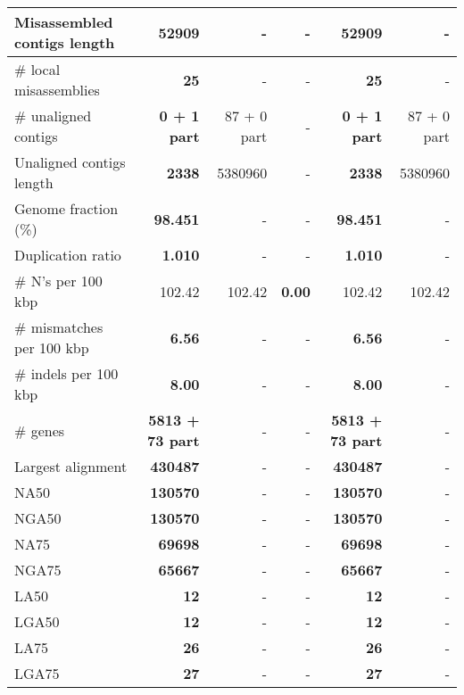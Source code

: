 \documentclass[12pt,a4paper]{article}
\begin{document}
\begin{table}[ht]
\begin{center}
\begin{tabular}{|l*{5}{|r}|}
Misassembled contigs length & {\bf 52909} & - & - & {\bf 52909} & - \\ \hline
\# local misassemblies & {\bf 25} & - & - & {\bf 25} & - \\ \hline
\# unaligned contigs & {\bf 0 + 1 part} & 87 + 0 part & - & {\bf 0 + 1 part} & 87 + 0 part \\ \hline
Unaligned contigs length & {\bf 2338} & 5380960 & - & {\bf 2338} & 5380960 \\ \hline
Genome fraction (\%) & {\bf 98.451} & - & - & {\bf 98.451} & - \\ \hline
Duplication ratio & {\bf 1.010} & - & - & {\bf 1.010} & - \\ \hline
\# N's per 100 kbp & 102.42 & 102.42 & {\bf 0.00} & 102.42 & 102.42 \\ \hline
\# mismatches per 100 kbp & {\bf 6.56} & - & - & {\bf 6.56} & - \\ \hline
\# indels per 100 kbp & {\bf 8.00} & - & - & {\bf 8.00} & - \\ \hline
\# genes & {\bf 5813 + 73 part} & - & - & {\bf 5813 + 73 part} & - \\ \hline
Largest alignment & {\bf 430487} & - & - & {\bf 430487} & - \\ \hline
NA50 & {\bf 130570} & - & - & {\bf 130570} & - \\ \hline
NGA50 & {\bf 130570} & - & - & {\bf 130570} & - \\ \hline
NA75 & {\bf 69698} & - & - & {\bf 69698} & - \\ \hline
NGA75 & {\bf 65667} & - & - & {\bf 65667} & - \\ \hline
LA50 & {\bf 12} & - & - & {\bf 12} & - \\ \hline
LGA50 & {\bf 12} & - & - & {\bf 12} & - \\ \hline
LA75 & {\bf 26} & - & - & {\bf 26} & - \\ \hline
LGA75 & {\bf 27} & - & - & {\bf 27} & - \\ \hline
\end{tabular}
\end{center}
\end{table}
\end{document}
